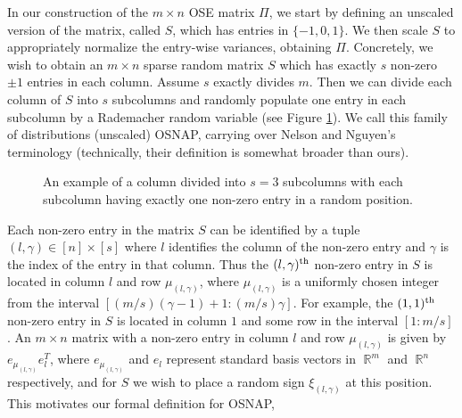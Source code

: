 \documentclass[11pt]{amsart}
\numberwithin{equation}{section}
\numberwithin{equation}{section}
\DeclareMathOperator{\R}{\mathbb{R}}
\theoremstyle{remark}
\theoremstyle{definition}
\begin{document}
In our construction of the $m\times n$ OSE matrix $\Pi$, we start by defining an unscaled version of the matrix, called $S$, which has entries in $\{-1,0,1\}$. We then scale $S$ to appropriately normalize the entry-wise variances, obtaining $\Pi$.
Concretely, we wish to obtain an $m \times n$ sparse random matrix $S$ which has exactly $s$ non-zero $\pm1$ entries in each column. Assume $s$ exactly divides $m$. Then we can divide each column of $S$ into $s$ subcolumns and randomly populate one entry in each subcolumn by a Rademacher random variable (see Figure \ref{fig:osnap}). We call this family of distributions (unscaled) OSNAP, carrying over Nelson and Nguyen's terminology (technically, their definition is somewhat broader than ours).

\begin{figure}[h!]
    \centering
    \caption{An example of a column divided into $s=3$ subcolumns with each subcolumn having exactly one non-zero entry in a random position.}
    \label{fig:osnap}
\end{figure}


Each non-zero entry in the matrix $S$ can be identified by a tuple $(l, \gamma) \in [n]\times [s]$ where $l$ identifies the column of the non-zero entry and $\gamma$ is the index of the entry in that column. Thus the $(l,\gamma)\textsuperscript{th}$ non-zero entry in $S$ is located in column $l$ and row $\mu_{(l,\gamma)}$, where $\mu_{(l,\gamma)}$ is a uniformly chosen integer from the interval $[(m/s)(\gamma-1)+1:(m/s)\gamma]$. For example, the $(1,1)\textsuperscript{th}$ non-zero entry in $S$ is located in column $1$ and some row in the interval $[1:m/s]$. An $m \times n$ matrix with a non-zero entry in column $l$ and row $\mu_{(l,\gamma)}$ is given by $e_{\mu_{(l,\gamma)}}e_l^T$, where $e_{\mu_{(l, \gamma)}}$ and $e_l$ represent standard basis vectors in $\R^m$ and $\R^n$ respectively, and for $S$ we wish to place a random sign $\xi_{(l,\gamma)}$ at this position. This motivates our formal definition for OSNAP,
\end{document}
